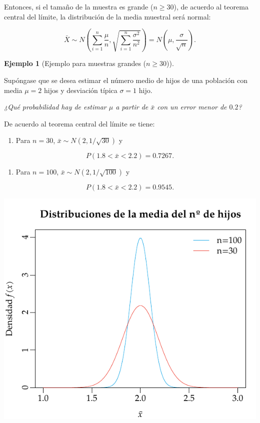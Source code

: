 \documentclass[
  a4paper,
]{scrreport}
\providecommand{\tightlist}{%
  \setlength{\itemsep}{0pt}\setlength{\parskip}{0pt}}\usepackage{longtable,booktabs,array}
\theoremstyle{plain}
\theoremstyle{definition}
\theoremstyle{definition}
\newtheorem{example}{Ejemplo}[chapter]
\theoremstyle{remark}
\begin{document}
Entonces, si el tamaño de la muestra es grande (\(n\geq 30\)), de
acuerdo al teorema central del límite, la distribución de la media
muestral será normal:

\[
\bar X \sim N\left(\sum_{i=1}^n \frac{\mu}{n},\sqrt{\sum_{i=1}^n \frac{\sigma^2}{n^2}} \right) = N\left(\mu,\frac{\sigma}{\sqrt{n}} \right).
\]

\begin{example}[Ejemplo para muestras grandes
(\(n\geq 30\))]\protect\hypertarget{exm-distribucion-media-muestras-grandes}{}\label{exm-distribucion-media-muestras-grandes}

Supóngase que se desea estimar el número medio de hijos de una población
con media \(\mu=2\) hijos y desviación típica \(\sigma=1\) hijo.

\emph{¿Qué probabilidad hay de estimar \(\mu\) a partir de \(\bar x\)
con un error menor de \(0.2\)?}

De acuerdo al teorema central del límite se tiene:

\begin{enumerate}
\def\labelenumi{\arabic{enumi}.}
\tightlist
\item
  Para \(n=30\), \(\bar x\sim N(2,1/\sqrt{30})\) y
\end{enumerate}

\[
P(1.8<\bar x<2.2) = 0.7267.
\]

\begin{enumerate}
\def\labelenumi{\arabic{enumi}.}
\tightlist
\item
  Para \(n=100\), \(\bar x\sim N(2,1/\sqrt{100})\) y
\end{enumerate}

\[
P(1.8<\bar x<2.2) = 0.9545.
\]

\begin{center}
\includegraphics{img/estimacion/teorema-central-limite.pdf}
\end{center}

\end{example}
\end{document}
